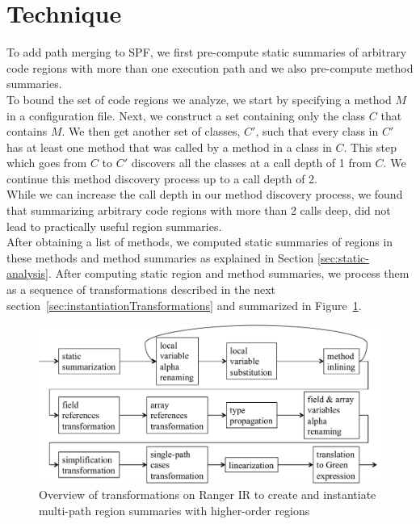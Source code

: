\section{Technique}
%
To add path merging to SPF, we first pre-compute static summaries of arbitrary code regions with more than one execution
path and we also pre-compute method summaries.\\
%
To bound the set of code regions we analyze, we start by specifying a method $M$ in a configuration file.
%
Next, we construct a set containing only the class $C$ that contains $M$.
%
We then get another set of classes, $C'$,
such that every class in $C'$ has at least one method that was called by a method in a class in $C$.
%
This step which goes from $C$ to $C'$ discovers all the classes at a call depth of 1 from $C$.
%
We continue this method discovery process up to a call depth of 2.\\
%
While we can increase the call depth in our method discovery process, we found that summarizing
arbitrary code regions with more than 2 calls deep, did not lead to practically useful region summaries.\\
%
After obtaining a list of methods, we computed static summaries of regions in these methods and method summaries as
explained in Section \ref{sec:static-analysis}.
%
After computing static region and method summaries, we process them as a sequence of transformations described in the next section~\ref{sec:instantiationTransformations} and summarized
in Figure~\ref{fig:overview}.
%
\begin{figure}[]
    \caption{Overview of transformations on Ranger IR to create and instantiate multi-path region summaries with higher-order regions}
    \label{fig:overview}
    \includegraphics[width=\textwidth]{figures/overview.pdf}
\end{figure}
%
%
